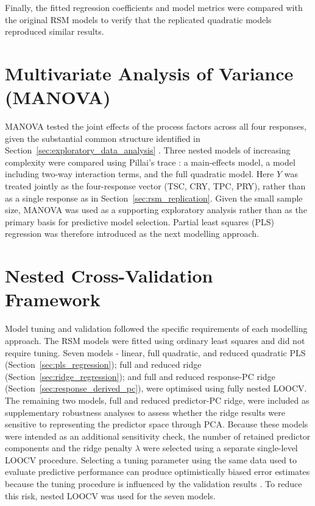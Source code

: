 \documentclass[MScDSA]{uccthesis}
\begin{document}
Finally, the fitted regression coefficients and model metrics were compared with the original RSM models to verify that the replicated quadratic models reproduced similar results.

\section{Multivariate Analysis of Variance (MANOVA)}
\label{sec:manova_model}
MANOVA tested the joint effects of the process factors across all four responses, given the substantial common structure identified in Section~\ref{sec:exploratory_data_analysis} \parencite{Mardia:1979}. Three nested models of increasing complexity were compared using Pillai's trace \parencite{Pillai:1955}: a main-effects model, a model including two-way interaction terms, and the full quadratic model. Here $Y$ was treated jointly as the four-response vector (TSC, CRY, TPC, PRY), rather than as a single response as in Section~\ref{sec:rsm_replication}. Given the small sample size, MANOVA was used as a supporting exploratory analysis rather than as the primary basis for predictive model selection. Partial least squares (PLS) regression was therefore introduced as the next modelling approach.

\section{Nested Cross-Validation Framework}
\label{sec:nested_cross_validation}
Model tuning and validation followed the specific requirements of each modelling approach. The RSM models were fitted using ordinary least squares and did not require tuning. Seven models - linear, full quadratic, and reduced quadratic PLS (Section~\ref{sec:pls_regression}); full and reduced ridge (Section~\ref{sec:ridge_regression}); and full and reduced response-PC ridge (Section~\ref{sec:response_derived_pc}), were optimised using fully nested LOOCV. The remaining two models, full and reduced predictor-PC ridge, were included as supplementary robustness analyses to assess whether the ridge results were sensitive to representing  the predictor space through PCA. Because these models were intended as an additional sensitivity check, the number of retained predictor components and the ridge penalty $\lambda$ were selected using a separate single-level LOOCV procedure.
Selecting a tuning parameter using the same data used to evaluate predictive performance can produce optimistically biased error estimates because the tuning procedure is influenced by the validation results \parencite{Varma:2006}. To reduce this risk, nested LOOCV was used for the seven models.
\end{document}
